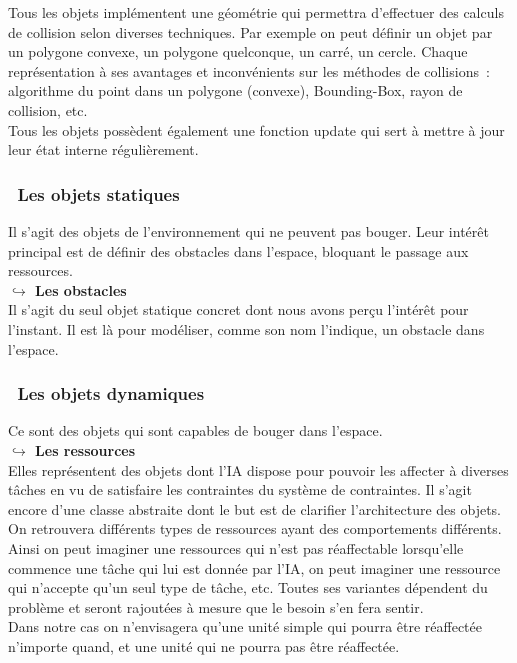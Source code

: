 Tous les objets implémentent une géométrie qui permettra d'effectuer des calculs de collision selon diverses techniques. Par exemple on peut définir un objet par un polygone convexe, un polygone quelconque, un carré, un cercle. Chaque représentation à ses avantages et inconvénients sur les méthodes de collisions~: algorithme du point dans un polygone (convexe), Bounding-Box, rayon de collision, etc.\\

Tous les objets possèdent également une fonction update qui sert à mettre à jour leur état interne régulièrement.

\subsubsection*{\textbullet ~Les objets statiques}

Il s'agit des objets de l'environnement qui ne peuvent pas bouger. Leur intérêt principal est de définir des obstacles dans l'espace, bloquant le passage aux ressources.\\

\textbf{$\hookrightarrow$ Les obstacles}\\

Il s'agit du seul objet statique concret dont nous avons perçu l’intérêt pour l'instant. Il est là pour modéliser, comme son nom l'indique, un obstacle dans l'espace.

\subsubsection*{\textbullet ~Les objets dynamiques}

Ce sont des objets qui sont capables de bouger dans l'espace.\\

\textbf{$\hookrightarrow$ Les ressources}\\

Elles représentent des objets dont l'IA dispose pour pouvoir les affecter à diverses tâches en vu de satisfaire les contraintes du système de contraintes. Il s'agit encore d'une classe abstraite dont le but est de clarifier l'architecture des objets. On retrouvera différents types de ressources ayant des comportements différents.\\
Ainsi on peut imaginer une ressources qui n'est pas réaffectable lorsqu'elle commence une tâche qui lui est donnée par l'IA, on peut imaginer une ressource qui n'accepte qu'un seul type de tâche, etc. Toutes ses variantes dépendent du problème et seront rajoutées à mesure que le besoin s'en fera sentir.\\
Dans notre cas on n'envisagera qu'une unité simple qui pourra être réaffectée n'importe quand, et une unité qui ne pourra pas être réaffectée.


